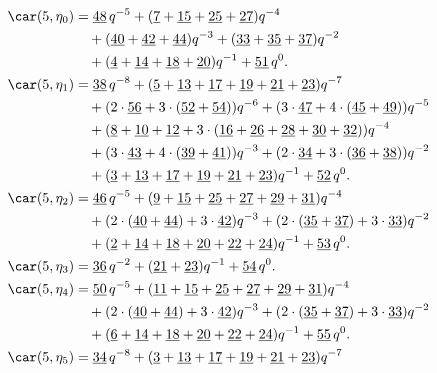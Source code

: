 \begin{align*}
	\car(5,\eta_{0})
	&=\underline{48}\,q^{-5}+(\underline{7}+\underline{15}+\underline{25}+\underline{27})q^{-4}\\
	&\quad+(\underline{40}+\underline{42}+\underline{44})q^{-3}+(\underline{33}+\underline{35}+\underline{37})q^{-2}\\
	&\quad+(\underline{4}+\underline{14}+\underline{18}+\underline{20})q^{-1}+\underline{51}\,q^0.\\
	\car(5,\eta_{1})
	&=\underline{38}\,q^{-8}+(\underline{5}+\underline{13}+\underline{17}+\underline{19}+\underline{21}+\underline{23})q^{-7}\\
	&\quad+(2\cdot\underline{56}+3\cdot(\underline{52}+\underline{54}))q^{-6}+(3\cdot\underline{47}+4\cdot(\underline{45}+\underline{49}))q^{-5}\\
	&\quad+(\underline{8}+\underline{10}+\underline{12}+3\cdot(\underline{16}+\underline{26}+\underline{28}+\underline{30}+\underline{32}))q^{-4}\\
	&\quad+(3\cdot\underline{43}+4\cdot(\underline{39}+\underline{41}))q^{-3}+(2\cdot\underline{34}+3\cdot(\underline{36}+\underline{38}))q^{-2}\\
	&\quad+(\underline{3}+\underline{13}+\underline{17}+\underline{19}+\underline{21}+\underline{23})q^{-1}+\underline{52}\,q^0.\\
	\car(5,\eta_{2})
	&=\underline{46}\,q^{-5}+(\underline{9}+\underline{15}+\underline{25}+\underline{27}+\underline{29}+\underline{31})q^{-4}\\
	&\quad+(2\cdot(\underline{40}+\underline{44})+3\cdot\underline{42})q^{-3}+(2\cdot(\underline{35}+\underline{37})+3\cdot\underline{33})q^{-2}\\
	&\quad+(\underline{2}+\underline{14}+\underline{18}+\underline{20}+\underline{22}+\underline{24})q^{-1}+\underline{53}\,q^0.\\
	\car(5,\eta_{3})
	&=\underline{36}\,q^{-2}+(\underline{21}+\underline{23})q^{-1}+\underline{54}\,q^0.\\
	\car(5,\eta_{4})
	&=\underline{50}\,q^{-5}+(\underline{11}+\underline{15}+\underline{25}+\underline{27}+\underline{29}+\underline{31})q^{-4}\\
	&\quad+(2\cdot(\underline{40}+\underline{44})+3\cdot\underline{42})q^{-3}+(2\cdot(\underline{35}+\underline{37})+3\cdot\underline{33})q^{-2}\\
	&\quad+(\underline{6}+\underline{14}+\underline{18}+\underline{20}+\underline{22}+\underline{24})q^{-1}+\underline{55}\,q^0.\\
	\car(5,\eta_{5})
	&=\underline{34}\,q^{-8}+(\underline{3}+\underline{13}+\underline{17}+\underline{19}+\underline{21}+\underline{23})q^{-7}\\

\end{align*}
